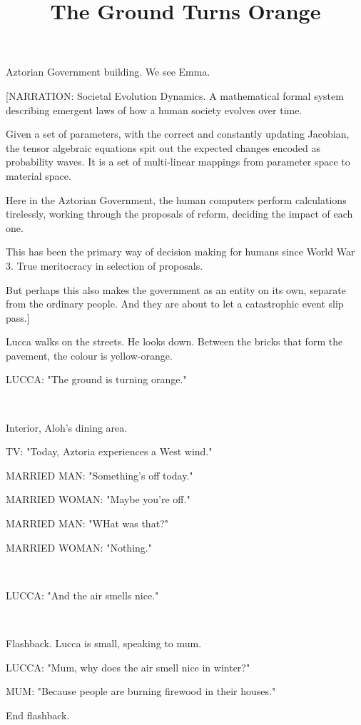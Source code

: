 \documentclass[11pt]{article}
\begin{document}
\ttfamily
\title{The Ground Turns Orange}
\maketitle

Aztorian Government building.
We see Emma.

[NARRATION: Societal Evolution Dynamics.
A mathematical formal system describing emergent laws of how a human society evolves over time. 

Given a set of parameters, with the correct and constantly updating Jacobian, the tensor algebraic equations spit out the expected changes encoded as probability waves.
It is a set of multi-linear mappings from parameter space to material space.

Here in the Aztorian Government, the human computers perform calculations tirelessly, working through the proposals of reform, deciding the impact of each one.

This has been the primary way of decision making for humans since World War 3.
True meritocracy in selection of proposals.

But perhaps this also makes the government as an entity on its own, separate from the ordinary people.
And they are about to let a catastrophic event slip pass.]

Lucca walks on the streets.
He looks down. 
Between the bricks that form the pavement, the colour is yellow-orange.

LUCCA: "The ground is turning orange."

\ 

Interior, Aloh's dining area.

TV: "Today, Aztoria experiences a West wind."

MARRIED MAN: "Something's off today."

MARRIED WOMAN: "Maybe you're off."

MARRIED MAN: "WHat was that?"

MARRIED WOMAN: "Nothing."

\ 

LUCCA: "And the air smells nice."

\ 

Flashback.
Lucca is small, speaking to mum.

LUCCA: "Mum, why does the air smell nice in winter?"

MUM: "Because people are burning firewood in their houses."

End flashback.
\end{document}
